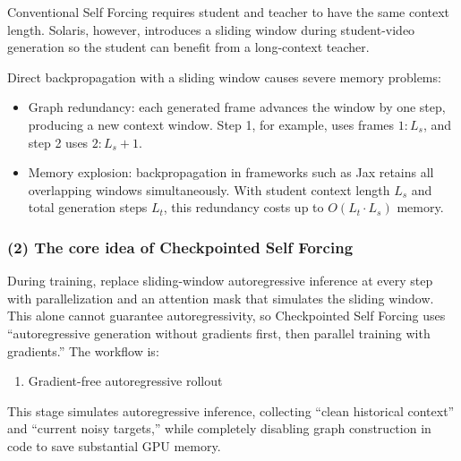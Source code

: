 Conventional Self Forcing requires student and teacher to have the same context length. Solaris, however, introduces a sliding window during student-video generation so the student can benefit from a long-context teacher.

Direct backpropagation with a sliding window causes severe memory problems:

\begin{itemize}
\tightlist
\item
  Graph redundancy: each generated frame advances the window by one step, producing a new context window. Step 1, for example, uses frames \(1:L_s\), and step 2 uses \(2:L_s+1\).
\item
  Memory explosion: backpropagation in frameworks such as Jax retains all overlapping windows simultaneously. With student context length \(L_s\) and total generation steps \(L_t\), this redundancy costs up to \(O(L_t\cdot L_s)\) memory.
\end{itemize}

\hypertarget{the-core-idea-of-checkpointed-self-forcing}{%
\subsubsection{(2) The core idea of Checkpointed Self Forcing}\label{the-core-idea-of-checkpointed-self-forcing}}

During training, replace sliding-window autoregressive inference at every step with parallelization and an attention mask that simulates the sliding window. This alone cannot guarantee autoregressivity, so Checkpointed Self Forcing uses ``autoregressive generation without gradients first, then parallel training with gradients.'' The workflow is:

\begin{enumerate}
\def\labelenumi{\arabic{enumi}.}
\tightlist
\item
  Gradient-free autoregressive rollout
\end{enumerate}

This stage simulates autoregressive inference, collecting ``clean historical context'' and ``current noisy targets,'' while completely disabling graph construction in code to save substantial GPU memory.

